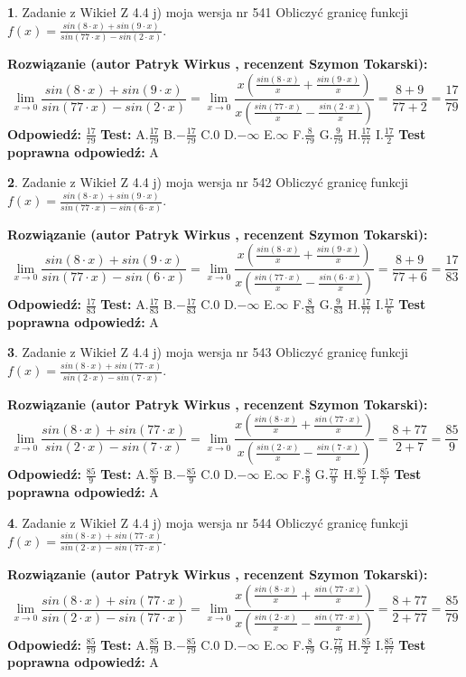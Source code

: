 \documentclass[12pt, a4paper]{article}
\theoremstyle{definition} %
\newtheorem{zad}{}
\newcommand{\zadStart}[1]{\begin{zad}#1\newline}
\newcommand{\zadStop}{\end{zad}}
\newcommand{\rozwStart}[2]{\noindent \textbf{Rozwiązanie (autor #1 , recenzent #2): }\newline}
\newcommand{\rozwStop}{\newline}
\newcommand{\odpStart}{\noindent \textbf{Odpowiedź:}\newline}
\newcommand{\odpStop}{\newline}
\newcommand{\testStart}{\noindent \textbf{Test:}\newline}
\newcommand{\testStop}{\newline}
\newcommand{\kluczStart}{\noindent \textbf{Test poprawna odpowiedź:}\newline}
\newcommand{\kluczStop}{\newline}
\begin{document}
\zadStart{Zadanie z Wikieł Z 4.4 j) moja wersja nr 541}
Obliczyć granicę funkcji $f(x)=\frac{sin(8\cdot x) +sin(9\cdot x)}{sin(77\cdot x) -sin(2\cdot x)}$.
\zadStop
\rozwStart{Patryk Wirkus}{Szymon Tokarski}
$$\lim\limits_{x\to 0}\frac{sin(8\cdot x) +sin(9\cdot x)}{sin(77\cdot x) -sin(2\cdot x)}=\lim\limits_{x\to 0}\frac{x(\frac{sin(8\cdot x)}{x}+\frac{sin(9\cdot x)}{x})}{x(\frac{sin(77\cdot x)}{x}-\frac{sin(2\cdot x)}{x})}=\frac{8+9}{77+2} = \frac{17}{79}$$
\rozwStop
\odpStart
$\frac{17}{79}$
\odpStop
\testStart
A.$\frac{17}{79}$
B.$-\frac{17}{79}$
C.$0$
D.$-\infty$
E.$\infty$
F.$\frac{8}{79}$
G.$\frac{9}{79}$
H.$\frac{17}{77}$
I.$\frac{17}{2}$
\testStop
\kluczStart
A
\kluczStop



\zadStart{Zadanie z Wikieł Z 4.4 j) moja wersja nr 542}
Obliczyć granicę funkcji $f(x)=\frac{sin(8\cdot x) +sin(9\cdot x)}{sin(77\cdot x) -sin(6\cdot x)}$.
\zadStop
\rozwStart{Patryk Wirkus}{Szymon Tokarski}
$$\lim\limits_{x\to 0}\frac{sin(8\cdot x) +sin(9\cdot x)}{sin(77\cdot x) -sin(6\cdot x)}=\lim\limits_{x\to 0}\frac{x(\frac{sin(8\cdot x)}{x}+\frac{sin(9\cdot x)}{x})}{x(\frac{sin(77\cdot x)}{x}-\frac{sin(6\cdot x)}{x})}=\frac{8+9}{77+6} = \frac{17}{83}$$
\rozwStop
\odpStart
$\frac{17}{83}$
\odpStop
\testStart
A.$\frac{17}{83}$
B.$-\frac{17}{83}$
C.$0$
D.$-\infty$
E.$\infty$
F.$\frac{8}{83}$
G.$\frac{9}{83}$
H.$\frac{17}{77}$
I.$\frac{17}{6}$
\testStop
\kluczStart
A
\kluczStop



\zadStart{Zadanie z Wikieł Z 4.4 j) moja wersja nr 543}
Obliczyć granicę funkcji $f(x)=\frac{sin(8\cdot x) +sin(77\cdot x)}{sin(2\cdot x) -sin(7\cdot x)}$.
\zadStop
\rozwStart{Patryk Wirkus}{Szymon Tokarski}
$$\lim\limits_{x\to 0}\frac{sin(8\cdot x) +sin(77\cdot x)}{sin(2\cdot x) -sin(7\cdot x)}=\lim\limits_{x\to 0}\frac{x(\frac{sin(8\cdot x)}{x}+\frac{sin(77\cdot x)}{x})}{x(\frac{sin(2\cdot x)}{x}-\frac{sin(7\cdot x)}{x})}=\frac{8+77}{2+7} = \frac{85}{9}$$
\rozwStop
\odpStart
$\frac{85}{9}$
\odpStop
\testStart
A.$\frac{85}{9}$
B.$-\frac{85}{9}$
C.$0$
D.$-\infty$
E.$\infty$
F.$\frac{8}{9}$
G.$\frac{77}{9}$
H.$\frac{85}{2}$
I.$\frac{85}{7}$
\testStop
\kluczStart
A
\kluczStop



\zadStart{Zadanie z Wikieł Z 4.4 j) moja wersja nr 544}
Obliczyć granicę funkcji $f(x)=\frac{sin(8\cdot x) +sin(77\cdot x)}{sin(2\cdot x) -sin(77\cdot x)}$.
\zadStop
\rozwStart{Patryk Wirkus}{Szymon Tokarski}
$$\lim\limits_{x\to 0}\frac{sin(8\cdot x) +sin(77\cdot x)}{sin(2\cdot x) -sin(77\cdot x)}=\lim\limits_{x\to 0}\frac{x(\frac{sin(8\cdot x)}{x}+\frac{sin(77\cdot x)}{x})}{x(\frac{sin(2\cdot x)}{x}-\frac{sin(77\cdot x)}{x})}=\frac{8+77}{2+77} = \frac{85}{79}$$
\rozwStop
\odpStart
$\frac{85}{79}$
\odpStop
\testStart
A.$\frac{85}{79}$
B.$-\frac{85}{79}$
C.$0$
D.$-\infty$
E.$\infty$
F.$\frac{8}{79}$
G.$\frac{77}{79}$
H.$\frac{85}{2}$
I.$\frac{85}{77}$
\testStop
\kluczStart
A
\kluczStop
\end{document}
